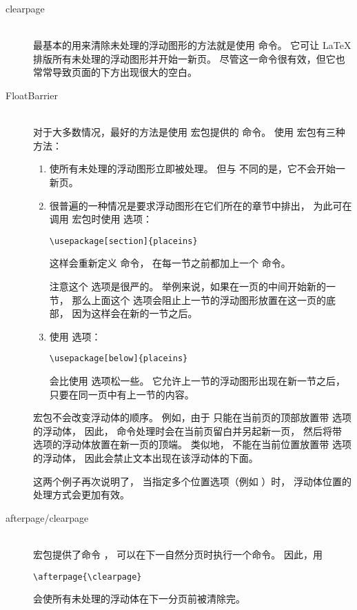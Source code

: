 \begin{description}
	\item [clearpage] \mbox{} \\
	最基本的用来清除未处理的浮动图形的方法就是使用  命令。
	它可让 \LaTeX{} 排版所有未处理的浮动图形并开始一新页。
	尽管这一命令很有效，但它也常常导致页面的下方出现很大的空白。
	
	\item [FloatBarrier] \mbox{} \\
	对于大多数情况，最好的方法是使用  宏包提供的  命令。
	使用  宏包有三种方法：
	\begin{enumerate}
		\item {} 使所有未处理的浮动图形立即被处理。
		但与  不同的是，它不会开始一新页。
		\item 很普遍的一种情况是要求浮动图形在它们所在的章节中排出，
		为此可在调用  宏包时使用  选项：
\begin{lstlisting}
\usepackage[section]{placeins}
\end{lstlisting}
		这样会重新定义  命令，
		在每一节之前都加上一个  命令。
		
		注意这个 \opt{[section]} 选项是很严的。
		举例来说，如果在一页的中间开始新的一节，
		那么上面这个  选项会阻止上一节的浮动图形放置在这一页的底部，
		因为这样会在新的一节之后。
		\item 使用  选项：
\begin{lstlisting}
\usepackage[below]{placeins}
\end{lstlisting}
		会比使用  选项松一些。
		它允许上一节的浮动图形出现在新一节之后，只要在同一页中有上一节的内容。
	\end{enumerate}
	 宏包不会改变浮动体的顺序。
	例如，由于  只能在当前页的顶部放置带 \opt{[t]} 选项的浮动体，
	因此， 命令处理时会在当前页留白并另起新一页，
	然后将带 \opt{[t]} 选项的浮动体放置在新一页的顶端。
	类似地， 不能在当前位置放置带 \opt{[b]} 选项的浮动体，
	因此会禁止文本出现在该浮动体的下面。
	
	这两个例子再次说明了，
	当指定多个位置选项（例如 ）时，
	浮动体位置的处理方式会更加有效。

	\item [afterpage/clearpage] \mbox{} \\
	 宏包提供了命令 ，
	可以在下一自然分页时执行一个命令。
	因此，用
\begin{lstlisting}
\afterpage{\clearpage}
\end{lstlisting}
	会使所有未处理的浮动体在下一分页前被清除完。
	

\end{description}
